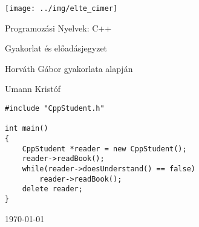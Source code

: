 \documentclass[a4paper,11.5pt, table]{article}
\theoremstyle{definition}
\newcommand{\<}{<\hspace{0mm}<} %
\newcommand{\onlyinsubfile}[1]{#1} %
\newcommand{\notinsubfile}[1]{} %
\begin{document}
	\renewcommand{\onlyinsubfile}[1]{}
	\renewcommand{\notinsubfile}[1]{#1}
	
	\begin{titlepage}
		\vspace*{2cm}
		\centering
		\texttt{[image: ../img/elte\_cimer]}
		
		\vspace*{2cm}
		{\Huge Programozási Nyelvek: C++ }
		
		\vspace{1cm}
		{\huge Gyakorlat és előadásjegyzet}
		
		\vspace*{5mm}
		{\large Horváth Gábor gyakorlata alapján}
		\vspace*{1.5cm}
		
		{\large Umann Kristóf}
		\vfill
		
		\begin{lstlisting}[frame=trbl, linewidth=12cm, xleftmargin=3.9cm, emph={CppStudent}]
#include "CppStudent.h"

int main()
{
	CppStudent *reader = new CppStudent();
	reader->readBook();
	while(reader->doesUnderstand() == false)
		reader->readBook();	
	delete reader;
}
		\end{lstlisting}
		\vfill
		
		\vspace*{1cm}
		\today
	\end{titlepage}
	\tableofcontents
	\pagebreak
	
	
	
	
	
	
	
	
	
	
	
	
\end{document}

